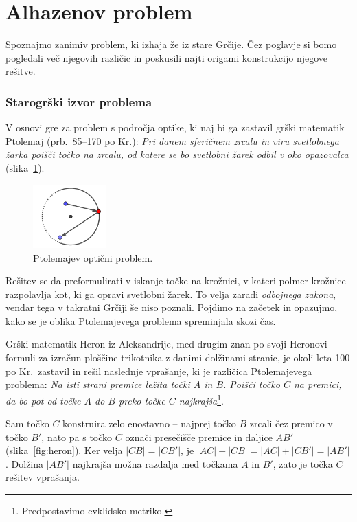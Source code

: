 \section{Alhazenov problem}

Spoznajmo zanimiv problem, ki izhaja že iz stare Grčije. Čez poglavje si bomo pogledali več njegovih različic in poskusili najti origami konstrukcijo njegove rešitve.

\subsubsection*{Starogrški izvor problema}

V osnovi gre za problem s področja optike, ki naj bi ga zastavil grški matematik Ptolemaj (prb.\ 85--170 po Kr.): \emph{Pri danem sferičnem zrcalu in viru svetlobnega žarka poišči točko na zrcalu, od katere se bo svetlobni žarek odbil v oko opazovalca} (slika~\ref{fig:ptolemaj}).

\begin{figure}[h]
    \centering
    \includegraphics[width=0.25\textwidth]{images/alhazen/ptolemajev_problem.png}
    \caption[Ptolemajev problem]{Ptolemajev optični problem.}
    \label{fig:ptolemaj}
\end{figure}

Rešitev se da preformulirati v iskanje točke na krožnici, v kateri polmer krožnice razpolavlja kot, ki ga opravi svetlobni žarek. To velja zaradi \emph{odbojnega zakona}, vendar tega v takratni Grčiji še niso poznali. Pojdimo na začetek in opazujmo, kako se je oblika Ptolemajevega problema spreminjala skozi čas.

Grški matematik Heron iz Aleksandrije, med drugim znan po svoji Heronovi formuli za izračun ploščine trikotnika z danimi dolžinami stranic, je okoli leta 100 po Kr.\ zastavil in rešil naslednje vprašanje, ki je različica Ptolemajevega problema: \emph{Na isti strani premice ležita točki $A$ in $B$. Poišči točko $C$ na premici, da bo pot od točke $A$ do $B$ preko točke $C$ najkrajša}\footnote{Predpostavimo evklidsko metriko.}.

Sam točko $C$ konstruira zelo enostavno -- najprej točko $B$ zrcali čez premico v točko $B'$, nato pa s točko $C$ označi presečišče premice in daljice $AB'$ (slika~\ref{fig:heron}). Ker velja $|CB| = |CB'|$, je $|AC| + |CB| = |AC| + |CB'| = |AB'|$. Dolžina $|AB'|$ najkrajša možna razdalja med točkama $A$ in $B'$, zato je točka $C$ rešitev vprašanja.

